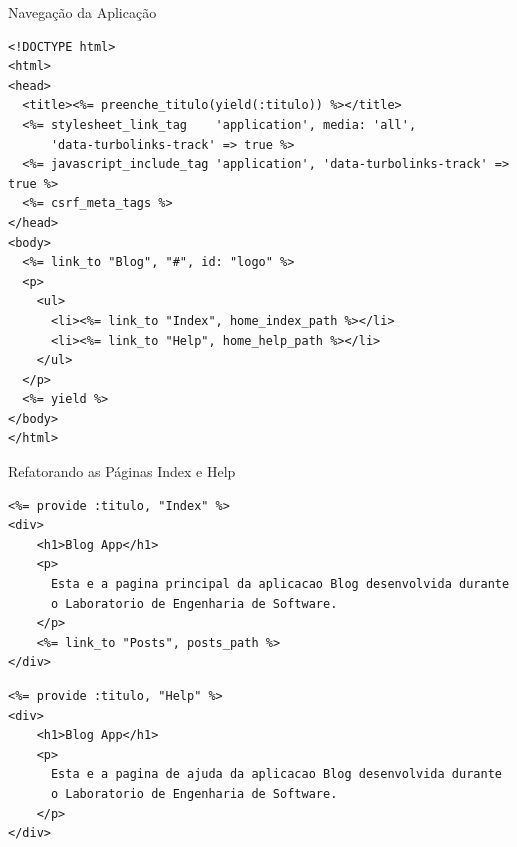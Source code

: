 \begin{frame}{Navegação da Aplicação}
      \begin{lstlisting}[style=RubyInputStyle, basicstyle=\tiny\ttfamily, caption=app/views/layouts/application.html.erb]
<!DOCTYPE html>
<html>
<head>
  <title><%= preenche_titulo(yield(:titulo)) %></title>
  <%= stylesheet_link_tag    'application', media: 'all', 
      'data-turbolinks-track' => true %>
  <%= javascript_include_tag 'application', 'data-turbolinks-track' => true %>
  <%= csrf_meta_tags %>
</head>
<body>
  <%= link_to "Blog", "#", id: "logo" %>
  <p>
    <ul>
      <li><%= link_to "Index", home_index_path %></li>
      <li><%= link_to "Help", home_help_path %></li>
    </ul>
  </p>
  <%= yield %>
</body>
</html>
      \end{lstlisting}
\end{frame} 

\begin{frame}{Refatorando as Páginas Index e Help}
   \begin{lstlisting}[style=RubyInputStyle, basicstyle=\tiny\ttfamily, caption=app/views/home/index.html.erb]
<%= provide :titulo, "Index" %>
<div>
    <h1>Blog App</h1>
    <p>
      Esta e a pagina principal da aplicacao Blog desenvolvida durante 
      o Laboratorio de Engenharia de Software.
    </p>
    <%= link_to "Posts", posts_path %>
</div>      
  \end{lstlisting}
  
   \begin{lstlisting}[style=RubyInputStyle, basicstyle=\tiny\ttfamily, caption=app/views/home/help.html.erb]
<%= provide :titulo, "Help" %>
<div>
    <h1>Blog App</h1>
    <p>
      Esta e a pagina de ajuda da aplicacao Blog desenvolvida durante 
      o Laboratorio de Engenharia de Software.
    </p>
</div>      
  \end{lstlisting}
\end{frame} 